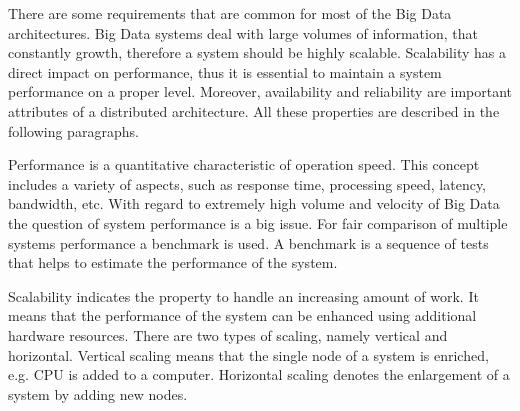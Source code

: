 


There are some requirements that are common for most of the Big Data architectures.
Big Data systems deal with large volumes of information, that constantly growth, therefore a system should be highly scalable.
Scalability has a direct impact on performance, thus it is essential to maintain a system performance on a proper level.
Moreover, availability and reliability are important attributes of a distributed architecture.
All these properties are described in the following paragraphs.

Performance is a quantitative characteristic of operation speed.  
This concept includes a variety of aspects, such as response time, processing speed, latency, bandwidth, etc.
With regard to extremely high volume and velocity of Big Data the question of system performance is a big issue.
For fair comparison of multiple systems performance a benchmark is used.
A benchmark is a sequence of tests that helps to estimate the performance of the system.

Scalability indicates the property to handle an increasing amount of work.
It means that the performance of the system can be enhanced using additional hardware resources.
There are two types of scaling, namely vertical and horizontal.
Vertical scaling means that the single node of a system is enriched, e.g. CPU is added to a computer. 
Horizontal scaling denotes the enlargement of a system by adding new nodes.

